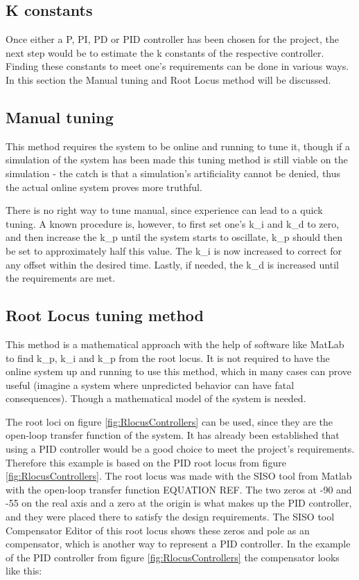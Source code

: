 \subsection{K constants}

Once either a P, PI, PD or PID controller has been chosen for the project, the next step would be to estimate the k constants of the respective controller. Finding these constants to meet one's requirements can be done in various ways. In this section the Manual tuning and Root Locus method will be discussed.


\subsection{Manual tuning}

This method requires the system to be online and running to tune it, though if a simulation of the system has been made this tuning method is still viable on the simulation - the catch is that a simulation’s artificiality cannot be denied, thus the actual online system proves more truthful.\par

There is no right way to tune manual, since experience can lead to a quick tuning. A known procedure is, however, to first set one’s k\_i and k\_d to zero, and then increase the k\_p until the system starts to oscillate, k\_p should then be set to approximately half this value. The k\_i is now increased to correct for any offset within the desired time. Lastly, if needed, the k\_d is increased until the requirements are met.


\subsection{Root Locus tuning method}

This method is a mathematical approach with the help of software like MatLab to find k\_p, k\_i and k\_p from the root locus. It is not required to have the online system up and running to use this method, which in many cases can prove useful (imagine a system where unpredicted behavior can have fatal consequences). Though a mathematical model of the system is needed.\par

The root loci on figure \ref{fig:RlocusControllers} can be used, since they are the open-loop transfer function of the system. It has already been established that using a PID controller would be a good choice to meet the project’s requirements. Therefore this example is based on the PID root locus from figure \ref{fig:RlocusControllers}. The root locus was made with the SISO tool from Matlab with the open-loop transfer function EQUATION REF. The two zeros at -90 and -55 on the real axis and a zero at the origin  is what makes up the PID controller, and they were placed there to satisfy the design requirements. The SISO tool Compensator Editor of this root locus shows these zeros and pole as an compensator, which is another way to represent a PID controller. In the example of the PID controller from figure \ref{fig:RlocusControllers}  the compensator looks like this:\\ 

